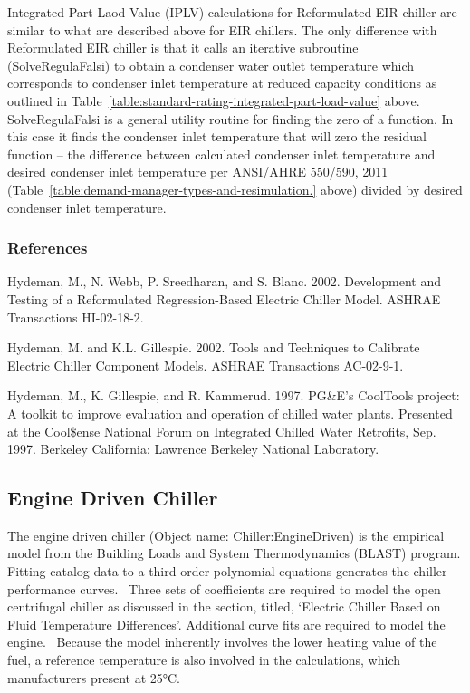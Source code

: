 Integrated Part Laod Value (IPLV) calculations for Reformulated EIR chiller are similar to what are described above for EIR chillers. The only difference with Reformulated EIR chiller is that it calls an iterative subroutine (SolveRegulaFalsi) to obtain a condenser water outlet temperature which corresponds to condenser inlet temperature at reduced capacity conditions as outlined in Table~\ref{table:standard-rating-integrated-part-load-value} above. SolveRegulaFalsi is a general utility routine for finding the zero of a function. In this case it finds the condenser inlet temperature that will zero the residual function -- the difference between calculated condenser inlet temperature and desired condenser inlet temperature per ANSI/AHRE 550/590, 2011 (Table~\ref{table:demand-manager-types-and-resimulation.} above) divided by desired condenser inlet temperature.

\subsubsection{References}\label{references-1-003}

Hydeman, M., N. Webb, P. Sreedharan, and S. Blanc. 2002. Development and Testing of a Reformulated Regression-Based Electric Chiller Model. ASHRAE Transactions HI-02-18-2.

Hydeman, M. and K.L. Gillespie. 2002. Tools and Techniques to Calibrate Electric Chiller Component Models. ASHRAE Transactions AC-02-9-1.

Hydeman, M., K. Gillespie, and R. Kammerud. 1997. PG\&E's CoolTools project: A toolkit to improve evaluation and operation of chilled water plants. Presented at the Cool\$ense National Forum on Integrated Chilled Water Retrofits, Sep. 1997. Berkeley California: Lawrence Berkeley National Laboratory.

\subsection{Engine Driven Chiller}\label{engine-driven-chiller}

The engine driven chiller (Object name: Chiller:EngineDriven) is the empirical model from the Building Loads and System Thermodynamics (BLAST) program. Fitting catalog data to a third order polynomial equations generates the chiller performance curves.~ Three sets of coefficients are required to model the open centrifugal chiller as discussed in the section, titled, `Electric Chiller Based on Fluid Temperature Differences'. Additional curve fits are required to model the engine.~ Because the model inherently involves the lower heating value of the fuel, a reference temperature is also involved in the calculations, which manufacturers present at 25°C.

